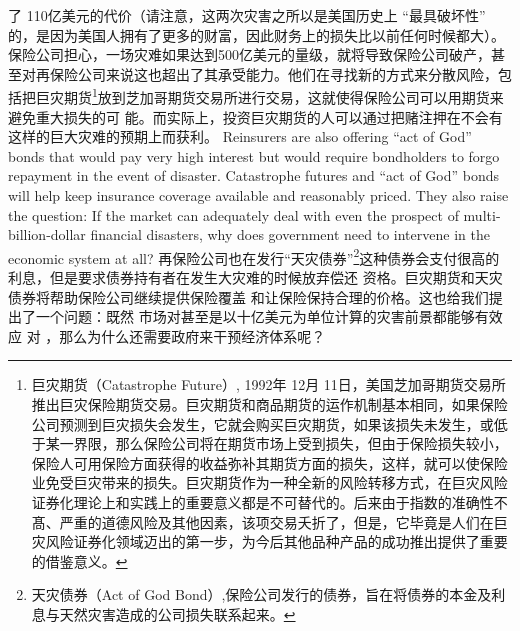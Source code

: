 \begin{paracol}{2}
了 110亿美元的代价（请注意，这两次灾害之所以是美国历史上 “最具破坏性” 的，是因为美国人拥有了更多的财富，因此财务上的损失比以前任何时候都大）。保险公司担心，一场灾难如果达到500亿美元的量级，就将导致保险公司破产，甚
至对再保险公司来说这也超出了其承受能力。他们在寻找新的方式来分散风险，包括把巨灾期货\footnote{巨灾期货（Catastrophe Future）, 1992年 12月 11日，美国芝加哥期货交易所推出巨灾保险期货交易。巨灾期货和商品期货的运作机制基本相同，如果保险公司预测到巨灾损失会发生，它就会购买巨灾期货，如果该损失未发生，或低于某一界限，那么保险公司将在期货市场上受到损失，但由于保险损失较小，保险人可用保险方面获得的收益弥补其期货方面的损失，这样，就可以使保险业免受巨灾带来的损失。巨灾期货作为一种全新的风险转移方式，在巨灾风险证券化理论上和实践上的重要意义都是不可替代的。后来由于指数的准确性不髙、严重的道德风险及其他因素，该项交易夭折了，但是，它毕竟是人们在巨灾风险证券化领域迈出的第一步，为今后其他品种产品的成功推出提供了重要的借鉴意义。}放到芝加哥期货交易所进行交易，这就使得保险公司可以用期货来避免重大损失的可
能。而实际上，投资巨灾期货的人可以通过把赌注押在不会有这样的巨大灾难的预期上而获利。
\switchcolumn*
Reinsurers are also offering ``act of God'' bonds that would
pay very high interest but would require bondholders to forgo
repayment in the event of disaster. Catastrophe futures and ``act
of God'' bonds will help keep insurance coverage available and
reasonably priced. They also raise the question: If the market
can adequately deal with even the prospect of multi-billion-dollar financial disasters, why does government need to intervene
in the economic system at all?
\switchcolumn
再保险公司也在发行“天灾债券”\footnote{天灾债券（Act of God Bond）,保险公司发行的债券，旨在将债券的本金及利息与天然灾害造成的公司损失联系起来。}这种债券会支付很高的利息，但是要求债券持有者在发生大灾难的时候放弃偿还
资格。巨灾期货和天灾债券将帮助保险公司继续提供保险覆盖
和让保险保持合理的价格。这也给我们提出了一个问题：既然
市场对甚至是以十亿美元为单位计算的灾害前景都能够有效应
对 ，那么为什么还需要政府来干预经济体系呢？


\end{paracol}
